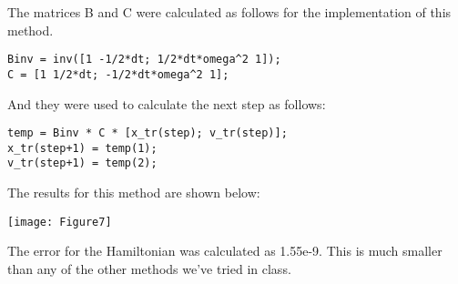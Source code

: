 \documentclass{article}
\begin{document}
The matrices B and C were calculated as follows for the implementation of this method.

\begin{verbatim}
Binv = inv([1 -1/2*dt; 1/2*dt*omega^2 1]);
C = [1 1/2*dt; -1/2*dt*omega^2 1];
\end{verbatim}

And they were used to calculate the next step as follows:
\begin{verbatim}
temp = Binv * C * [x_tr(step); v_tr(step)];
x_tr(step+1) = temp(1);
v_tr(step+1) = temp(2);
\end{verbatim}

The results for this method are shown below:

\texttt{[image: Figure7]}


The error for the Hamiltonian was calculated as 1.55e-9. This is much smaller than any of the other methods we've tried in class. 
\end{document}
